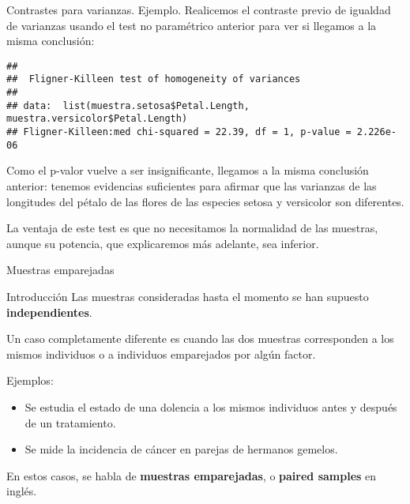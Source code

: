 \documentclass[
  ignorenonframetext,
]{beamer}
\newenvironment{Shaded}{\begin{snugshade}}{\end{snugshade}}
\newcommand{\KeywordTok}[1]{\textcolor[rgb]{0.13,0.29,0.53}{\textbf{#1}}}
\newcommand{\NormalTok}[1]{#1}
\newcommand{\OperatorTok}[1]{\textcolor[rgb]{0.81,0.36,0.00}{\textbf{#1}}}
\begin{document}
\begin{frame}[fragile]{Contrastes para varianzas. Ejemplo.}
\protect\hypertarget{contrastes-para-varianzas.-ejemplo.}{}
Realicemos el contraste previo de igualdad de varianzas usando el test
no paramétrico anterior para ver si llegamos a la misma conclusión:

\begin{Shaded}
\end{Shaded}

\begin{verbatim}
## 
##  Fligner-Killeen test of homogeneity of variances
## 
## data:  list(muestra.setosa$Petal.Length, muestra.versicolor$Petal.Length)
## Fligner-Killeen:med chi-squared = 22.39, df = 1, p-value = 2.226e-06
\end{verbatim}

Como el p-valor vuelve a ser insignificante, llegamos a la misma
conclusión anterior: tenemos evidencias suficientes para afirmar que las
varianzas de las longitudes del pétalo de las flores de las especies
setosa y versicolor son diferentes.

La ventaja de este test es que no necesitamos la normalidad de las
muestras, aunque su potencia, que explicaremos más adelante, sea
inferior.
\end{frame}

\begin{frame}{Muestras emparejadas}
\protect\hypertarget{muestras-emparejadas}{}
\end{frame}

\begin{frame}{Introducción}
\protect\hypertarget{introducciuxf3n-2}{}
Las muestras consideradas hasta el momento se han supuesto
\textbf{independientes}.

Un caso completamente diferente es cuando las dos muestras corresponden
a los mismos individuos o a individuos emparejados por algún factor.

Ejemplos:

\begin{itemize}
\item
  Se estudia el estado de una dolencia a los mismos individuos antes y
  después de un tratamiento.
\item
  Se mide la incidencia de cáncer en parejas de hermanos gemelos.
\end{itemize}

En estos casos, se habla de \textbf{muestras emparejadas}, o
\textbf{paired samples} en inglés.
\end{frame}
\end{document}
